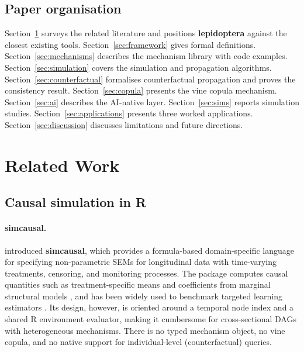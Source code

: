 \documentclass[12pt,a4paper]{article}
\newcommand{\pkg}[1]{\textbf{#1}}
\newcommand{\proglang}[1]{\textsf{#1}}
\begin{document}
\subsection{Paper organisation}

Section~\ref{sec:related} surveys the related literature and positions
\pkg{lepidoptera} against the closest existing tools. Section~\ref{sec:framework}
gives formal definitions. Section~\ref{sec:mechanisms} describes the mechanism
library with code examples. Section~\ref{sec:simulation} covers the simulation
and propagation algorithms. Section~\ref{sec:counterfactual} formalises
counterfactual propagation and proves the consistency result. Section~\ref{sec:copula}
presents the vine copula mechanism. Section~\ref{sec:ai} describes the AI-native
layer. Section~\ref{sec:sims} reports simulation studies. Section~\ref{sec:applications}
presents three worked applications. Section~\ref{sec:discussion} discusses
limitations and future directions.

\section{Related Work}
\label{sec:related}

\subsection{Causal simulation in \proglang{R}}

\paragraph{\pkg{simcausal}.}
\citet{sofrygin2017simcausal} introduced \pkg{simcausal}, which provides a
formula-based domain-specific language for specifying non-parametric SEMs for
longitudinal data with time-varying treatments, censoring, and monitoring
processes. The package computes causal quantities such as treatment-specific means
and coefficients from marginal structural models \citep{robins2000marginal}, and
has been widely used to benchmark targeted learning estimators
\citep{luedtke2016tloss, laan2018targeted}. Its design, however, is oriented
around a temporal node index and a shared \proglang{R} environment evaluator,
making it cumbersome for cross-sectional DAGs with heterogeneous mechanisms. There
is no typed mechanism object, no vine copula, and no native support for
individual-level (counterfactual) queries.
\end{document}
